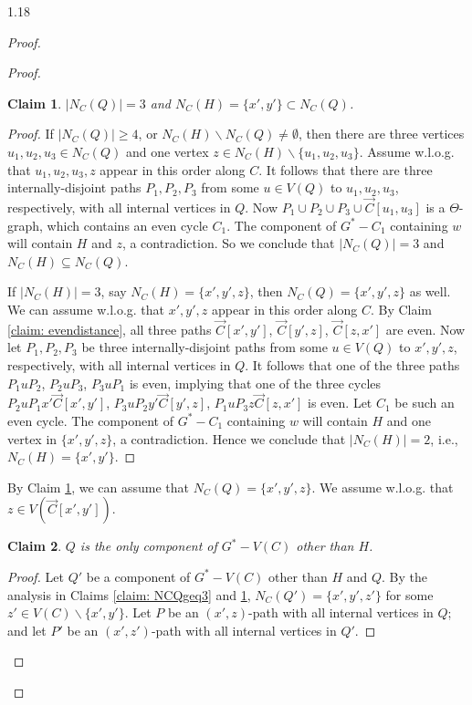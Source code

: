 \documentclass[10pt]{article}
\newtheorem{subclaim}{Claim}[claim]
\begin{document}
\begin{spacing}{1.18}
\begin{proof}
\begin{proof}
    \begin{subclaim}\label{claim: NCQeq3}
        $|N_C(Q)|=3$ and $N_C(H)=\{x',y'\}\subset N_C(Q)$.
    \end{subclaim}

    \begin{proof}
        If $|N_C(Q)|\geqslant 4$, or $N_C(H)\backslash N_C(Q)\neq\emptyset$, then there are three vertices $u_1,u_2,u_3\in N_C(Q)$ and one vertex $z\in N_C(H)\backslash\{u_1,u_2,u_3\}$. Assume w.l.o.g. that $u_1,u_2,u_3,z$ appear in this order along $C$. It follows that there are three internally-disjoint paths $P_1,P_2,P_3$ from some $u\in V(Q)$ to $u_1,u_2,u_3$, respectively, with all internal vertices in $Q$. Now $P_1\cup P_2\cup P_3\cup\overrightarrow{C}[u_1,u_3]$ is a $\varTheta$-graph, which contains an even cycle $C_1$. The component of $G^*-C_1$ containing $w$ will contain $H$ and $z$, a contradiction. So we conclude that $|N_C(Q)|=3$ and $N_C(H)\subseteq N_C(Q)$.

        If $|N_C(H)|=3$, say $N_C(H)=\{x',y',z\}$, then $N_C(Q)=\{x',y',z\}$ as well. We can assume w.l.o.g. that $x',y',z$ appear in this order along $C$. By Claim \ref{claim: evendistance}, all three paths $\overrightarrow{C}[x',y']$, $\overrightarrow{C}[y',z]$, $\overrightarrow{C}[z,x']$ are even. Now let $P_1,P_2,P_3$ be three internally-disjoint paths from some $u\in V(Q)$ to $x',y',z$, respectively, with all internal vertices in $Q$. It follows that one of the three paths $P_1uP_2$, $P_2uP_3$, $P_3uP_1$ is even, implying that one of the three cycles $P_2uP_1x'\overrightarrow{C}[x',y']$, $P_3uP_2y'\overrightarrow{C}[y',z]$, $P_1uP_3z\overrightarrow{C}[z,x']$ is even. Let $C_1$ be such an even cycle. The component of $G^*-C_1$ containing $w$ will contain $H$ and one vertex in $\{x',y',z\}$, a contradiction. Hence we conclude that $|N_C(H)|=2$, i.e., $N_C(H)=\{x',y'\}$.
    \end{proof}

    By Claim \ref{claim: NCQeq3}, we can assume that $N_C(Q)=\{x',y',z\}$. We assume w.l.o.g. that $z\in V(\overrightarrow{C}[x',y'])$.

    \begin{subclaim}\label{claim: onecomponentQ}
        $Q$ is the only component of $G^*-V(C)$ other than $H$.
    \end{subclaim}

    \begin{proof}
        Let $Q'$ be a component of $G^*-V(C)$ other than $H$ and $Q$. By the analysis in Claims \ref{claim: NCQgeq3} and \ref{claim: NCQeq3}, $N_C(Q')=\{x',y',z'\}$ for some $z'\in V(C)\backslash\{x',y'\}$. Let $P$ be an $(x',z)$-path with all internal vertices in $Q$; and let $P'$ be an $(x',z')$-path with all internal vertices in $Q'$.


\end{proof}
\end{proof}
\end{proof}
\end{spacing}
\end{document}
